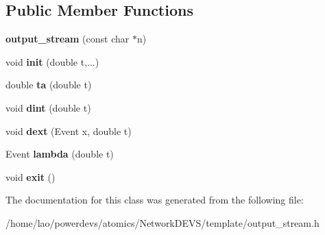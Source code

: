 \subsection*{Public Member Functions}
\begin{DoxyCompactItemize}
\item 
{\bfseries output\+\_\+stream} (const char $\ast$n)\hypertarget{classoutput__stream_a7f886e28fa127c83d740a1460201989f}{}\label{classoutput__stream_a7f886e28fa127c83d740a1460201989f}

\item 
void {\bfseries init} (double t,...)\hypertarget{classoutput__stream_a2e26da84f458d7f2dd4a4ae6c3ef7c04}{}\label{classoutput__stream_a2e26da84f458d7f2dd4a4ae6c3ef7c04}

\item 
double {\bfseries ta} (double t)\hypertarget{classoutput__stream_ae304fdfee60d5aa1a69035236911e569}{}\label{classoutput__stream_ae304fdfee60d5aa1a69035236911e569}

\item 
void {\bfseries dint} (double t)\hypertarget{classoutput__stream_a566afa2f41b8e37e2d5a20e98dd7756f}{}\label{classoutput__stream_a566afa2f41b8e37e2d5a20e98dd7756f}

\item 
void {\bfseries dext} (Event x, double t)\hypertarget{classoutput__stream_ac00feadae41dc26511742d557e502864}{}\label{classoutput__stream_ac00feadae41dc26511742d557e502864}

\item 
Event {\bfseries lambda} (double t)\hypertarget{classoutput__stream_a5136f3bb17d67bb82266d0c5ec092a41}{}\label{classoutput__stream_a5136f3bb17d67bb82266d0c5ec092a41}

\item 
void {\bfseries exit} ()\hypertarget{classoutput__stream_a190253159ea0776ff7436e7a729253fd}{}\label{classoutput__stream_a190253159ea0776ff7436e7a729253fd}

\end{DoxyCompactItemize}


The documentation for this class was generated from the following file\+:\begin{DoxyCompactItemize}
\item 
/home/lao/powerdevs/atomics/\+Network\+D\+E\+V\+S/template/output\+\_\+stream.\+h\end{DoxyCompactItemize}
